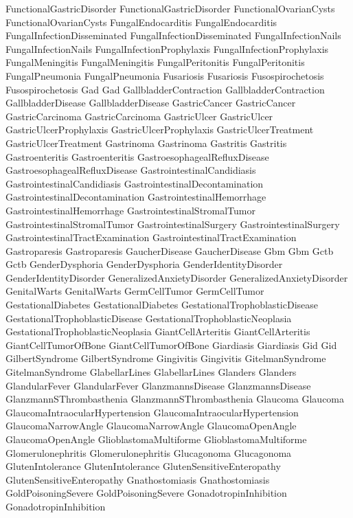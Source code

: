  FunctionalGastricDisorder
 FunctionalGastricDisorder
 FunctionalOvarianCysts
 FunctionalOvarianCysts
 FungalEndocarditis
 FungalEndocarditis
 FungalInfectionDisseminated
 FungalInfectionDisseminated
 FungalInfectionNails
 FungalInfectionNails
 FungalInfectionProphylaxis
 FungalInfectionProphylaxis
 FungalMeningitis
 FungalMeningitis
 FungalPeritonitis
 FungalPeritonitis
 FungalPneumonia
 FungalPneumonia
 Fusariosis
 Fusariosis
 Fusospirochetosis
 Fusospirochetosis
 Gad
 Gad
 GallbladderContraction
 GallbladderContraction
 GallbladderDisease
 GallbladderDisease
 GastricCancer
 GastricCancer
 GastricCarcinoma
 GastricCarcinoma
 GastricUlcer
 GastricUlcer
 GastricUlcerProphylaxis
 GastricUlcerProphylaxis
 GastricUlcerTreatment
 GastricUlcerTreatment
 Gastrinoma
 Gastrinoma
 Gastritis
 Gastritis
 Gastroenteritis
 Gastroenteritis
 GastroesophagealRefluxDisease
 GastroesophagealRefluxDisease
 GastrointestinalCandidiasis
 GastrointestinalCandidiasis
 GastrointestinalDecontamination
 GastrointestinalDecontamination
 GastrointestinalHemorrhage
 GastrointestinalHemorrhage
 GastrointestinalStromalTumor
 GastrointestinalStromalTumor
 GastrointestinalSurgery
 GastrointestinalSurgery
 GastrointestinalTractExamination
 GastrointestinalTractExamination
 Gastroparesis
 Gastroparesis
 GaucherDisease
 GaucherDisease
 Gbm
 Gbm
 Gctb
 Gctb
 GenderDysphoria
 GenderDysphoria
 GenderIdentityDisorder
 GenderIdentityDisorder
 GeneralizedAnxietyDisorder
 GeneralizedAnxietyDisorder
 GenitalWarts
 GenitalWarts
 GermCellTumor
 GermCellTumor
 GestationalDiabetes
 GestationalDiabetes
 GestationalTrophoblasticDisease
 GestationalTrophoblasticDisease
 GestationalTrophoblasticNeoplasia
 GestationalTrophoblasticNeoplasia
 GiantCellArteritis
 GiantCellArteritis
 GiantCellTumorOfBone
 GiantCellTumorOfBone
 Giardiasis
 Giardiasis
 Gid
 Gid
 GilbertSyndrome
 GilbertSyndrome
 Gingivitis
 Gingivitis
 GitelmanSyndrome
 GitelmanSyndrome
 GlabellarLines
 GlabellarLines
 Glanders
 Glanders
 GlandularFever
 GlandularFever
 GlanzmannsDisease
 GlanzmannsDisease
 GlanzmannSThrombasthenia
 GlanzmannSThrombasthenia
 Glaucoma
 Glaucoma
 GlaucomaIntraocularHypertension
 GlaucomaIntraocularHypertension
 GlaucomaNarrowAngle
 GlaucomaNarrowAngle
 GlaucomaOpenAngle
 GlaucomaOpenAngle
 GlioblastomaMultiforme
 GlioblastomaMultiforme
 Glomerulonephritis
 Glomerulonephritis
 Glucagonoma
 Glucagonoma
 GlutenIntolerance
 GlutenIntolerance
 GlutenSensitiveEnteropathy
 GlutenSensitiveEnteropathy
 Gnathostomiasis
 Gnathostomiasis
 GoldPoisoningSevere
 GoldPoisoningSevere
 GonadotropinInhibition
 GonadotropinInhibition
